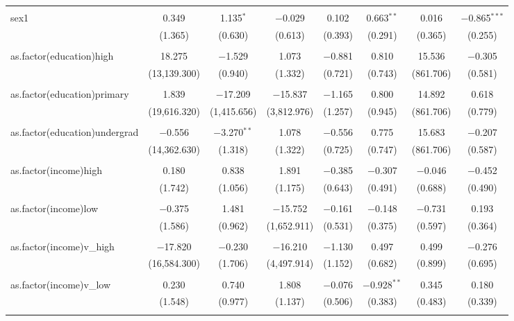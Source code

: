 \documentclass[12pt,letterpaper]{article}
\begin{document}
\begin{table}[!htbp]
\begin{adjustbox}{max width=\textwidth}
\begin{tabular}{@{\extracolsep{5pt}}lccccccc}
		& & & & & & & \\ 
		sex1 & 0.349 & 1.135$^{*}$ & $-$0.029 & 0.102 & 0.663$^{**}$ & 0.016 & $-$0.865$^{***}$ \\ 
		& (1.365) & (0.630) & (0.613) & (0.393) & (0.291) & (0.365) & (0.255) \\ 
		& & & & & & & \\ 
		as.factor(education)high & 18.275 & $-$1.529 & 1.073 & $-$0.881 & 0.810 & 15.536 & $-$0.305 \\ 
		& (13,139.300) & (0.940) & (1.332) & (0.721) & (0.743) & (861.706) & (0.581) \\ 
		& & & & & & & \\ 
		as.factor(education)primary & 1.839 & $-$17.209 & $-$15.837 & $-$1.165 & 0.800 & 14.892 & 0.618 \\ 
		& (19,616.320) & (1,415.656) & (3,812.976) & (1.257) & (0.945) & (861.706) & (0.779) \\ 
		& & & & & & & \\ 
		as.factor(education)undergrad & $-$0.556 & $-$3.270$^{**}$ & 1.078 & $-$0.556 & 0.775 & 15.683 & $-$0.207 \\ 
		& (14,362.630) & (1.318) & (1.322) & (0.725) & (0.747) & (861.706) & (0.587) \\ 
		& & & & & & & \\ 
		as.factor(income)high & 0.180 & 0.838 & 1.891 & $-$0.385 & $-$0.307 & $-$0.046 & $-$0.452 \\ 
		& (1.742) & (1.056) & (1.175) & (0.643) & (0.491) & (0.688) & (0.490) \\ 
		& & & & & & & \\ 
		as.factor(income)low & $-$0.375 & 1.481 & $-$15.752 & $-$0.161 & $-$0.148 & $-$0.731 & 0.193 \\ 
		& (1.586) & (0.962) & (1,652.911) & (0.531) & (0.375) & (0.597) & (0.364) \\ 
		& & & & & & & \\ 
		as.factor(income)v\_high & $-$17.820 & $-$0.230 & $-$16.210 & $-$1.130 & 0.497 & 0.499 & $-$0.276 \\ 
		& (16,584.300) & (1.706) & (4,497.914) & (1.152) & (0.682) & (0.899) & (0.695) \\ 
		& & & & & & & \\ 
		as.factor(income)v\_low & 0.230 & 0.740 & 1.808 & $-$0.076 & $-$0.928$^{**}$ & 0.345 & 0.180 \\ 
		& (1.548) & (0.977) & (1.137) & (0.506) & (0.383) & (0.483) & (0.339) \\ 
		& & & & & & & \\ 

\end{tabular}
\end{adjustbox}
\end{table}
\end{document}
